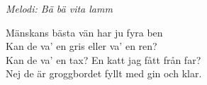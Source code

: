 {\footnotesize\textit{Melodi: Bä bä vita lamm}}\par
\vspace{10pt}
Mänskans bästa vän har ju fyra ben\\
Kan de va' en gris eller va' en ren?\\
Kan de va' en tax? En katt jag fått från far?\\
Nej de är groggbordet fyllt med gin och klar.
